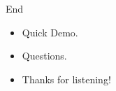 \documentclass{beamer}
\begin{document}
\begin{frame}{End}
    \begin{itemize}
        \item Quick Demo.
        \item Questions.
        \item Thanks for listening!
    \end{itemize}
\end{frame}
















\end{document}
